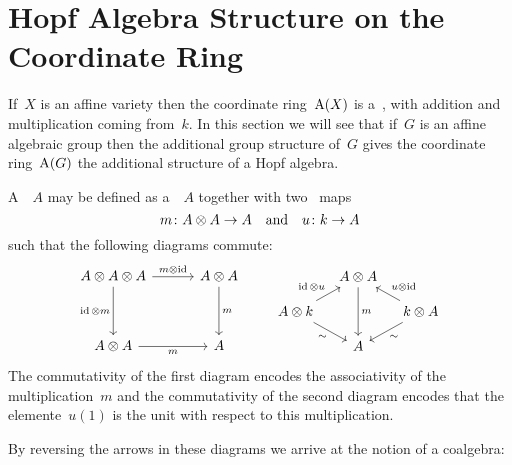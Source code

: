 \section{Hopf Algebra Structure on the Coordinate Ring}


\begin{fluff}
  If~$X$ is an affine variety then the coordinate ring~$\operatorname{A}(X)$ is a~, with addition and multiplication coming from~$k$.
  In this section we will see that if~$G$ is an affine algebraic group then the additional group structure of~$G$ gives the coordinate ring~$\operatorname{A}(G)$ the additional structure of a Hopf algebra. 
\end{fluff}


\begin{fluff}
  A~~$A$ may be defined as a~{\kvs}~$A$ together with two~ maps
  \[
    m \colon A \otimes A \to A
    \quad\text{and}\quad
    u \colon k \to A
  \]
  such that the following diagrams commute:
  \[
    \begin{tikzcd}[column sep = 30pt, row sep = 35pt]
        A \tensor A \tensor A
        \arrow{r}[above]{m \tensor \id}
        \arrow{d}[left]{\id \tensor m}
      & A \tensor A
        \arrow{d}[right]{m}
      \\
        A \tensor A
        \arrow{r}[below]{m}
      & A
    \end{tikzcd}
    \quad\quad
    \begin{tikzcd}[column sep = 10pt, row sep = 10pt]
        {}
      & A \tensor A
        \arrow{dd}[right]{m}
      & {}
      \\
        A \tensor k
        \arrow{ur}{\id \tensor u}
        \arrow{dr}[below left]{\sim}
      & {}
      & k \tensor A
        \arrow{ul}[above right]{u \tensor \id}
        \arrow{dl}[below right]{\sim}
      \\
        {}
      & A
      & {}
    \end{tikzcd}
  \]
  The commutativity of the first diagram encodes the associativity of the multiplication~$m$ and the commutativity of the second diagram encodes that the elemente~$u(1)$ is the unit with respect to this multiplication.
  
  By reversing the arrows in these diagrams we arrive at the notion of a coalgebra:
\end{fluff}


